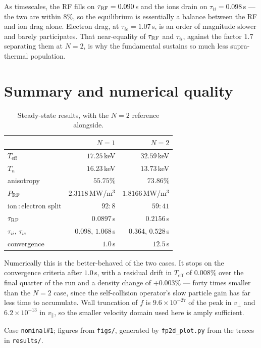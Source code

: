 \documentclass[11pt,a4paper]{article}
\newcommand{\code}[1]{\texttt{\small #1}}
\newcommand{\Teff}{T_{\mathrm{eff}}}
\newcommand{\vperp}{v_\perp}
\newcommand{\vpar}{v_\parallel}
\begin{document}
As timescales, the RF fills on $\tau_{\rm RF}=0.090\,$s and the ions drain on
$\tau_{ii}=0.098\,$s --- the two are within $8\%$, so the equilibrium is
essentially a balance between the RF and ion drag alone. Electron drag, at
$\tau_{ie}=1.07\,$s, is an order of magnitude slower and barely participates.
That near-equality of $\tau_{\rm RF}$ and $\tau_{ii}$, against the factor $1.7$
separating them at $N{=}2$, is why the fundamental sustains so much less
supra-thermal population.

\vspace{-0.2cm}
\section{Summary and numerical quality}

\begin{table}[h]
\centering\small
\caption{Steady-state results, with the $N{=}2$ reference alongside.}
\begin{tabular}{@{}lrr@{}}
\toprule
 & $N{=}1$ & $N{=}2$ \\
\midrule
$\Teff$                  & $17.25\,$keV   & $32.59\,$keV \\
$T_n$                    & $16.23\,$keV   & $13.73\,$keV \\
anisotropy               & $55.75\%$      & $73.86\%$ \\
$P_{\rm RF}$             & $2.3118\,$MW/m$^3$ & $1.8166\,$MW/m$^3$ \\
ion\,:\,electron split   & $92:8$         & $59:41$ \\
$\tau_{\rm RF}$          & $0.0897\,$s    & $0.2156\,$s \\
$\tau_{ii}$, $\tau_{ie}$ & $0.098$, $1.068\,$s & $0.364$, $0.528\,$s \\
convergence              & $1.0\,$s       & $12.5\,$s \\
\bottomrule
\end{tabular}
\end{table}

Numerically this is the better-behaved of the two cases. It stops on the
convergence criteria after $1.0\,$s, with a residual drift in $\Teff$ of
$0.008\%$ over the final quarter of the run and a density change of $+0.003\%$
--- forty times smaller than the $N{=}2$ case, since the self-collision
operator's slow particle gain has far less time to accumulate. Wall truncation
of $f$ is $9.6\times10^{-27}$ of the peak in $\vperp$ and $6.2\times10^{-13}$ in
$\vpar$, so the smaller velocity domain used here is amply sufficient.

\vspace{0.2cm}
\noindent\footnotesize
Case \code{nominal\#1}; figures from \code{figs/}, generated by
\code{fp2d\_plot.py} from the traces in \code{results/}.
\end{document}
